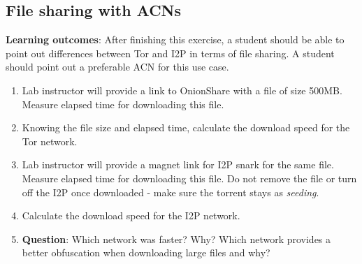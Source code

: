 \subsection{File sharing with ACNs}
\textbf{Learning outcomes}: After finishing this exercise, a student should be able to point out differences between Tor and I2P in terms of file sharing. A student should point out a preferable ACN for this use case.
\begin{enumerate}
    \item Lab instructor will provide a link to OnionShare with a file of size 500MB. Measure elapsed time for downloading this file.
    \item Knowing the file size and elapsed time, calculate the download speed for the Tor network.
    \item Lab instructor will provide a magnet link for I2P snark for the same file. Measure elapsed time for downloading this file. Do not remove the file or turn off the I2P once downloaded - make sure the torrent stays as \textit{seeding}.
    \item Calculate the download speed for the I2P network.
    \item \textbf{Question}: Which network was faster? Why? Which network provides a better obfuscation when downloading large files and why?
\end{enumerate}
